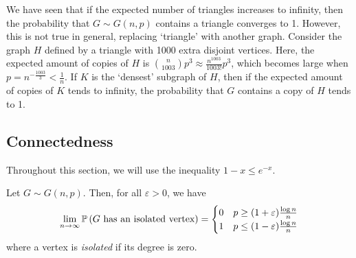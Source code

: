 \begin{remark}
	We have seen that if the expected number of triangles increases to infinity, then the probability that \( G \sim G(n,p) \) contains a triangle converges to 1.
	However, this is not true in general, replacing `triangle' with another graph.
	Consider the graph \( H \) defined by a triangle with 1000 extra disjoint vertices.
	Here, the expected amount of copies of \( H \) is \( \binom{n}{1003} p^3 \approx \frac{n^{1003}}{1003!} p^3 \), which becomes large when \( p = n^{-\frac{1003}{3}} < \frac{1}{n} \).
	If \( K \) is the `densest' subgraph of \( H \), then if the expected amount of copies of \( K \) tends to infinity, the probability that \( G \) contains a copy of \( H \) tends to 1.
\end{remark}

\subsection{Connectedness}
Throughout this section, we will use the inequality \( 1 - x \leq e^{-x} \).
\begin{proposition}
	Let \( G \sim G(n,p) \).
	Then, for all \( \varepsilon > 0 \), we have
	\[ \lim_{n \to \infty} \mathbb{P}\left({G \text{ has an isolated vertex}}\right) = \begin{cases}
		0 & p \geq (1 + \varepsilon) \frac{\log n}{n} \\
		1 & p \leq (1 - \varepsilon) \frac{\log n}{n}
	\end{cases} \]
	where a vertex is \emph{isolated} if its degree is zero.
\end{proposition}
